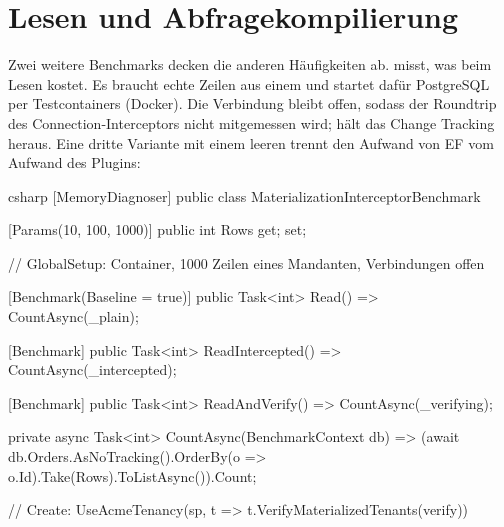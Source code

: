 \section{Lesen und Abfragekompilierung}

Zwei weitere Benchmarks decken die anderen Häufigkeiten ab.
 misst, was
 beim Lesen kostet. Es
braucht echte Zeilen aus einem  und startet dafür
PostgreSQL per Testcontainers (Docker). Die Verbindung bleibt offen, sodass der Roundtrip des
Connection-Interceptors nicht mitgemessen wird; 
hält das Change Tracking heraus. Eine dritte Variante mit einem leeren
 trennt den Aufwand von EF vom Aufwand des
Plugins:

\begin{sourcecode}{csharp}
[MemoryDiagnoser]
public class MaterializationInterceptorBenchmark
{
    [Params(10, 100, 1000)]
    public int Rows { get; set; }

    // GlobalSetup: Container, 1000 Zeilen eines Mandanten, Verbindungen offen

    [Benchmark(Baseline = true)]
    public Task<int> Read() => CountAsync(_plain);

    [Benchmark]
    public Task<int> ReadIntercepted() => CountAsync(_intercepted);

    [Benchmark]
    public Task<int> ReadAndVerify() => CountAsync(_verifying);

    private async Task<int> CountAsync(BenchmarkContext db)
        => (await db.Orders.AsNoTracking().OrderBy(o => o.Id).Take(Rows).ToListAsync()).Count;

    // Create: UseAcmeTenancy(sp, t => t.VerifyMaterializedTenants(verify))
}
\end{sourcecode}

